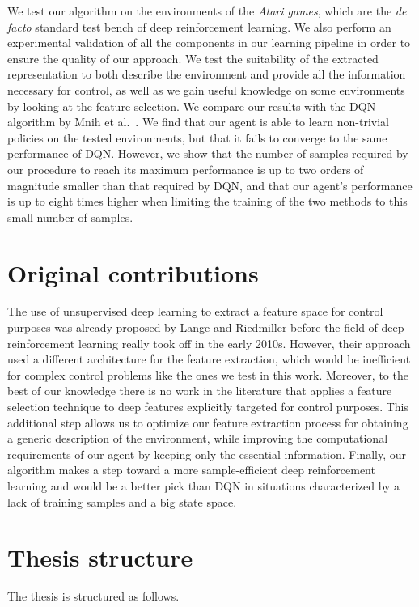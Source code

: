 We test our algorithm on the environments of the \textit{Atari games}, which are
the \textit{de facto} standard test bench of deep reinforcement learning. We 
also perform an experimental validation of all the components in our learning 
pipeline in order to ensure the quality of our approach.
We test the suitability of the extracted representation to both describe the 
environment and provide all the information necessary for control, as well as 
we gain useful knowledge on some environments by looking at the feature 
selection.
We compare our results with the DQN algorithm by Mnih et al.\ \cite{mnih2015human}.
We find that our agent is able to learn non-trivial policies on the tested 
environments, but that it fails to converge to the same performance of DQN. 
However, we show that the number of samples required by our procedure to reach 
its maximum performance is up to two orders of magnitude smaller than that 
required by DQN, and that our agent's performance is up to eight times higher 
when limiting the training of the two methods to this small number of samples.

\section{Original contributions}
The use of unsupervised deep learning to extract a feature space for control 
purposes was already proposed by Lange and Riedmiller \cite{lange2010deep} 
before the field of deep reinforcement learning really took off in the early 
2010s. 
However, their approach used a different architecture for the feature extraction, 
which would be inefficient for complex control problems like the ones we test
in this work. 
Moreover, to the best of our knowledge there is no work in the literature that
applies a feature selection technique to deep features explicitly targeted 
for control purposes. This additional step allows us to optimize our feature 
extraction process for obtaining a generic description of the environment, 
while improving the computational requirements of our agent by keeping
only the essential information. 
Finally, our algorithm makes a step toward a more sample-efficient deep 
reinforcement learning and would be a better pick than DQN in situations 
characterized by a lack of training samples and a big state space. 

\section{Thesis structure}
The thesis is structured as follows. 

